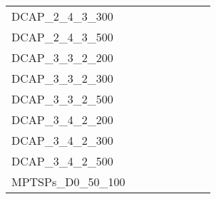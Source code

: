 \begin{table}[H]
{\begin{tabular}{|l|ll|ll|l|l|l|}
			DCAP\_2\_4\_3\_300             &                                 &                                &                                  &                                 &                                    &                            &                            \\
			DCAP\_2\_4\_3\_500             &                                 &                                &                                  &                                 &                                    &                            &                            \\
			DCAP\_3\_3\_2\_200             &                                 &                                &                                  &                                 &                                    &                            &                            \\
			DCAP\_3\_3\_2\_300             &                                 &                                &                                  &                                 &                                    &                            &                            \\
			DCAP\_3\_3\_2\_500             &                                 &                                &                                  &                                 &                                    &                            &                            \\
			DCAP\_3\_4\_2\_200             &                                 &                                &                                  &                                 &                                    &                            &                            \\
			DCAP\_3\_4\_2\_300             &                                 &                                &                                  &                                 &                                    &                            &                            \\
			DCAP\_3\_4\_2\_500             &                                 &                                &                                  &                                 &                                    &                            &                            \\ \hline
			MPTSPs\_D0\_50\_100            &                                 &                                &                                  &                                 &                                    &                            &                            \\

\end{tabular}}
\end{table}
